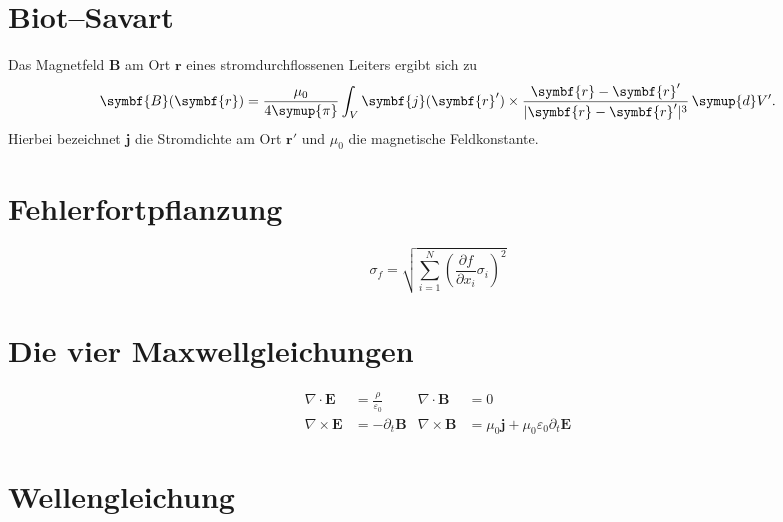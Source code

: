 \documentclass{scrartcl}
\begin{document}
\section{Biot--Savart}

Das Magnetfeld $\symbf{B}$ am Ort $\symbf{r}$ eines stromdurchflossenen Leiters ergibt sich zu
\begin{equation}
  \symbf{B}(\symbf{r}) = \frac{\mu_0}{4 \symup{\pi}}
    \int_V \symbf{j}(\symbf{r}') \times \frac{\symbf{r} - \symbf{r}'}{\lvert \symbf{r} - \symbf{r}' \rvert^3} \, \symup{d}V' .
\end{equation}
Hierbei bezeichnet $\symbf{j}$ die Stromdichte am Ort $\symbf{r}'$ und $\mu_0$ die magnetische Feldkonstante.

\section{Fehlerfortpflanzung}

\begin{equation}
  \sigma_f = \sqrt{
    \sum\limits_{i = 1}^N
      \left( \frac{\partial f}{\partial x_i} \sigma_i \right)^{\!\! 2}
  }
\end{equation}

\section{Die vier Maxwellgleichungen}

\begin{align}
  \nabla \cdot  \symbf{E} &= \frac{\rho}{\varepsilon_0} &
  \nabla \cdot  \symbf{B} &= 0 \\
  \nabla \times \symbf{E} &= - \partial_t \symbf{B} &
  \nabla \times \symbf{B} &= \mu_0 \symbf{j} + \mu_0 \varepsilon_0 \partial_t \symbf{E}
\end{align}

\section{Wellengleichung}
\end{document}

